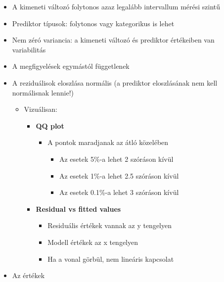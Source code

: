 \documentclass[
  letterpaper,
  DIV=11,
  numbers=noendperiod]{scrreprt}
\begin{document}
\begin{itemize}
\item
  A kimeneti változó folytonos azaz legalább intervallum mérési szintű
\item
  Prediktor típusok: folytonos vagy kategorikus is lehet
\item
  Nem zéró variancia: a kimeneti változó és prediktor értékeiben van
  variabilitás
\item
  A megfigyelések egymástól függetlenek
\item
  A reziduálisok eloszlása normális (a prediktor eloszlásának nem kell
  normálisnak lennie!)

  \begin{itemize}
  \item
    Vizuálisan:~

    \begin{itemize}
    \item
      \textbf{QQ plot}

      \begin{itemize}
      \item
        A pontok maradjanak az átló közelében

        \begin{itemize}
        \item
          Az esetek 5\%-a lehet 2 szóráson kívül
        \item
          Az esetek 1\%-a lehet 2.5 szóráson kívül
        \item
          Az esetek 0.1\%-a lehet 3 szóráson kívül
        \end{itemize}
      \end{itemize}
    \item
      \textbf{Residual vs fitted values}

      \begin{itemize}
      \item
        Residuális értékek vannak az y tengelyen
      \item
        Modell értékek az x tengelyen
      \item
        Ha a vonal görbül, nem lineáris kapcsolat
      \end{itemize}
    \end{itemize}
  \end{itemize}
\item
  Az értékek


\end{itemize}
\end{document}
